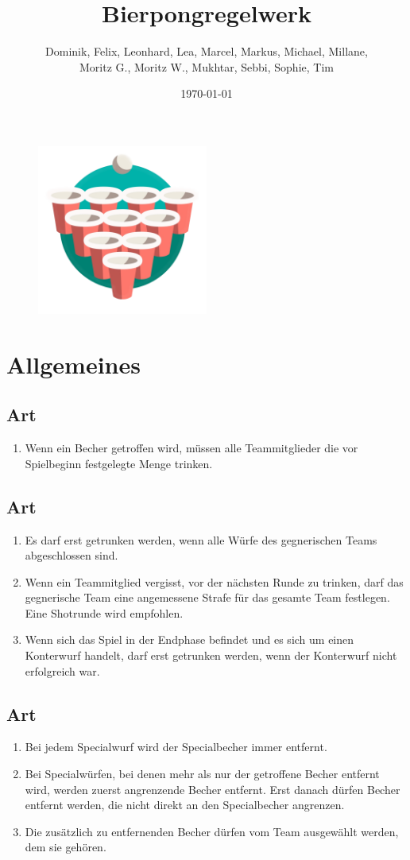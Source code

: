 \documentclass[a4paper,11pt]{scrartcl}
\title{\Huge{Bierpongregelwerk}}
\author{Dominik, Felix, Leonhard, Lea, Marcel, Markus, Michael, Millane, \\Moritz G., Moritz W., Mukhtar, Sebbi, Sophie, Tim}
\date{\small{\today}}
\newcommand{\enum}[1]{\begin{enumerate}[label=(\arabic*)]#1\end{enumerate}}
\newcommand{\art}[2]{\subsection*{#1} \enum{#2}}
\newcounter{art}
\begin{document}
 
\maketitle
\vspace*{-1cm}
\vspace*{2.5cm}
\begin{figure}[ht]
    \centering
    \includegraphics[width=0.5\textwidth]{images/title.png}
\end{figure}

\newpage

\section{Allgemeines}
    \art{Art \theart}{
        \item
            Wenn ein Becher getroffen wird, müssen alle Teammitglieder die vor Spielbeginn festgelegte Menge trinken.
    }

    \art{Art \theart}{
        \item
            Es darf erst getrunken werden, wenn alle Würfe des gegnerischen Teams abgeschlossen sind.
        \item
            Wenn ein Teammitglied vergisst, vor der nächsten Runde zu trinken, darf das gegnerische Team eine angemessene Strafe für das gesamte Team festlegen. Eine Shotrunde wird empfohlen.
        \item
            Wenn sich das Spiel in der Endphase befindet und es sich um einen Konterwurf handelt, darf erst getrunken werden, wenn der Konterwurf nicht erfolgreich war.
    }

    \art{Art \theart}{
        \item
            Bei jedem Specialwurf wird der Specialbecher immer entfernt.
        \item
            Bei Specialwürfen, bei denen mehr als nur der getroffene Becher entfernt wird, werden zuerst angrenzende Becher entfernt. Erst danach dürfen Becher entfernt werden, die nicht direkt an den Specialbecher angrenzen.
        \item
            Die zusätzlich zu entfernenden Becher dürfen vom Team ausgewählt werden, dem sie gehören.
    }
\end{document}
